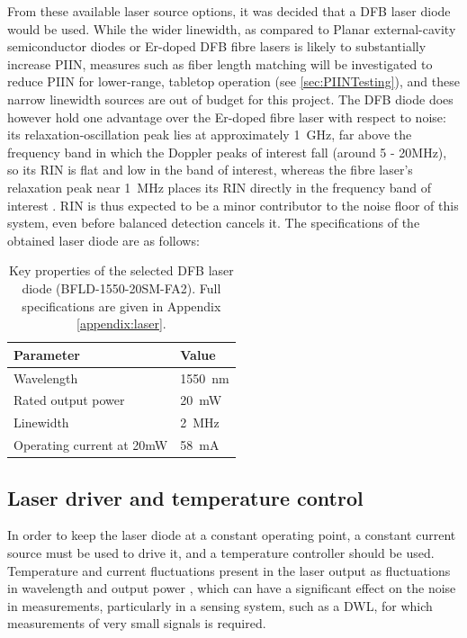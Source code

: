 From these available laser source options, it was decided that a DFB laser diode would be used. While the wider linewidth, as compared to Planar external-cavity semiconductor diodes or Er-doped DFB fibre lasers is likely to substantially increase PIIN, measures such as fiber length matching will be investigated to reduce PIIN for lower-range, tabletop operation (see \autoref{sec:PIINTesting}), and these narrow linewidth sources are out of budget for this project. The DFB diode does however hold one advantage over the Er-doped fibre laser with respect to noise: its relaxation-oscillation peak lies at approximately \SI{1}{\giga\hertz}, far above the frequency band in which the Doppler peaks of interest fall (around 5 - 20MHz), so its RIN is flat and low in the band of interest, whereas the fibre laser's relaxation peak near \SI{1}{\mega\hertz} places its RIN directly in the frequency band of interest \cite{cariou2006laser}. RIN is thus expected to be a minor contributor to the noise floor of this system, even before balanced detection cancels it. The specifications of the obtained laser diode are as follows:
\begin{table}[H]
	\centering
	
	\begin{tabular}{@{}ll@{}}
		\toprule
		\textbf{Parameter} & \textbf{Value} \\
		\midrule
		Wavelength                  & 1550~nm \\
		Rated output power          & 20~mW \\
		Linewidth                   & 2~MHz \\
		Operating current at 20mW & 58~mA \\
		\bottomrule
	\end{tabular}
	\caption{Key properties of the selected DFB laser diode
		(BFLD-1550-20SM-FA2). Full specifications are given in Appendix
		\ref{appendix:laser}.}
		\label{tab:dfb-laser}
\end{table}



\subsection{Laser driver and temperature control}
In order to keep the laser diode at a constant operating point, a constant current source must be used to drive it, and a temperature controller should be used. Temperature and current fluctuations present in the laser output as fluctuations in wavelength and output power \cite{Gwinner2024}, which can have a significant effect on the noise in measurements, particularly in a sensing system, such as a DWL, for which measurements of very small signals is required.

